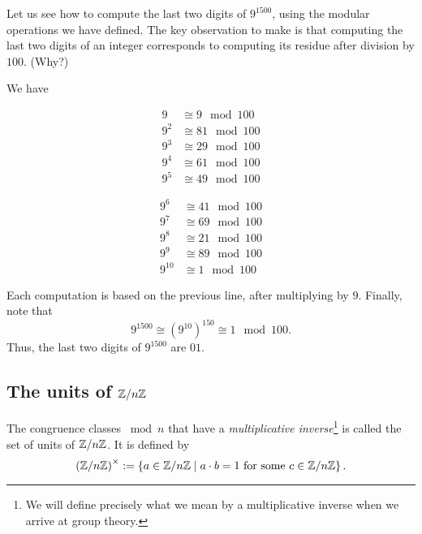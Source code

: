 \documentclass[11pt,a4paper]{article}
\begin{document}
Let us see how to compute the last two digits of \(9^{1500}\), using the modular operations we have defined.
The key observation to make is that computing the last two digits of an integer corresponds to computing its residue   after division by \(100\).
(Why?)

We have  
\vspace{-\baselineskip}
\begin{center}
    \begin{minipage}{0.3\linewidth}
        \begin{align*}
            9 &\cong 9 \mod 100\\
            9^2 &\cong 81 \mod 100\\
            9^3 &\cong 29 \mod 100\\
            9^4 &\cong 61 \mod 100\\
            9^5 &\cong 49 \mod 100
        \end{align*}
        \end{minipage}
        \begin{minipage}{0.3\linewidth}
        \begin{align*}
            9^6 &\cong 41 \mod 100\\
            9^7 &\cong 69 \mod 100\\
            9^8 &\cong 21 \mod 100\\
            9^9 &\cong 89 \mod 100\\
            9^{10} &\cong 1 \mod 100
        \end{align*}
    \end{minipage}
\end{center}
    

Each computation is based on the previous line, after  multiplying by \(9\).
Finally, note that \[9^{1500} \cong (9^{10})^{150} \cong 1\mod 100.\]
Thus, the last two digits of \(9^{1500}\) are \(01\).


\subsection[]{The units of \(\mathbb{Z}/n \mathbb{Z}\)}

The congruence classes \(\bmod n\) that have a \textit{multiplicative inverse}\footnote{We will define precisely what we mean by a multiplicative inverse when we arrive at group theory.} is called the set of units of \(\mathbb{Z}/n \mathbb{Z}\). It is defined by 
\[\left( \mathbb{Z}/n \mathbb{Z} \right)^\times := \left\{ a\in  \mathbb{Z}/n \mathbb{Z} \mid a\cdot b = 1 \text{ for some } c\in \mathbb{Z}/n \mathbb{Z} \right\}.\]
\end{document}
